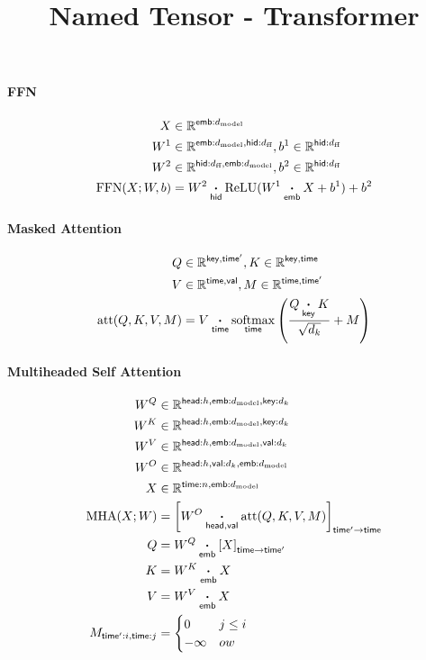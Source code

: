\documentclass{article}
\title{Named Tensor - Transformer}
\date{}
\DeclareMathOperator*{\softmax}{softmax}
\newcommand{\reals}[0]{\mathbb{R}}
\newcommand{\name}[1]{\mathsf{#1}}
\newcommand{\ndot}[1]{\mathbin{\mathop{\thinspace\boldsymbol\cdot\thinspace}\displaylimits_{\name{#1}}}}
\newcommand{\nfun}[2]{\underset{\name{#1}}{#2}}
\newcommand{\dmodel}{d_{\text{model}}}
\newcommand{\dff}{d_{\text{ff}}}
\begin{document}
\maketitle
\vspace{-2cm}


\paragraph{FFN}
\begin{align*}
X &\in \reals^{\name{emb}:\dmodel} \\
W^1 &\in \reals^{\name{emb}:\dmodel, \name{hid}:\dff }, 
b^1 \in \reals^{\name{hid}:\dff} \\
W^2 & \in \reals^{ \name{hid}:\dff, \name{emb}:\dmodel}, b^2 \in \reals^{\name{hid}:\dff} \\
\text{FFN}(X; W, b) &=  W^2 \ndot{hid} \text{ReLU}(W^1 \ndot{emb} X + b^1) + b^2
\end{align*}

\paragraph{Masked Attention}
\begin{align*} 
Q &\in \reals^{\name{key}, \name{time'}},  K \in \reals^{\name{key}, \name{time}}\\
V &\in \reals^{\name{time}, \name{val}},
M \in \reals^{\name{time}, \name{time'}}\\
\text{att}(Q, K, V, M) &=  V \ndot{time} \nfun{time}{\softmax} \left( \frac{\displaystyle Q \ndot{key} K }{\sqrt{d_k}} + M\right) 
\end{align*}

\paragraph{Multiheaded Self Attention}
\begin{align*}
 W^Q &\in \mathbb{R}^{\name{head}:h, \name{emb}:\dmodel, \name{key}:d_k} \\
  W^K &\in \mathbb{R}^{\name{head}:h, \name{emb}:\dmodel, \name{key}:d_k} \\
   W^V &\in \mathbb{R}^{\name{head}:h, \name{emb}:\dmodel, \name{val}:d_k} \\
  W^O &\in \mathbb{R}^{\name{head}:h, \name{val}:d_k, \name{emb}:\dmodel} \\
  X &\in \mathbb{R}^{\name{time}:n, \name{emb}:\dmodel} \\
  \text{MHA}(X; W) &= \left[W^O \ndot{head,val} \text{att}(Q, K, V, M) \right]_{\name{time'} \rightarrow \name{time}} \\
  Q &= W^Q \ndot{emb} \left[X\right]_{\name{time}\rightarrow\name{time'}} \\
  K &= W^K \ndot{emb} X \\
  V &= W^V \ndot{emb} X \\
 M_{\name{time'}:i, \name{time}:j} &= \begin{cases} 0 & j\leq i \\ -\infty & ow \end{cases}   
\end{align*}
\end{document}
